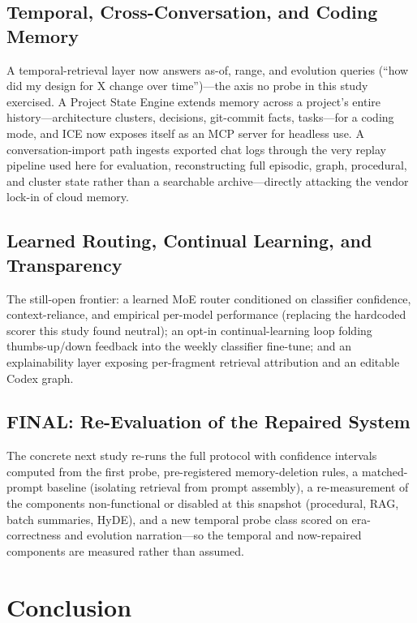 \documentclass[10pt]{article}
\begin{document}
\subsection{Temporal, Cross-Conversation, and Coding Memory}
A temporal-retrieval layer now answers as-of, range, and evolution queries (``how did my design for X change over time'')---the axis no probe in this study exercised. A Project State Engine extends memory across a project's entire history---architecture clusters, decisions, git-commit facts, tasks---for a coding mode, and ICE now exposes itself as an MCP server for headless use. A conversation-import path ingests exported chat logs through the very replay pipeline used here for evaluation, reconstructing full episodic, graph, procedural, and cluster state rather than a searchable archive---directly attacking the vendor lock-in of cloud memory.

\subsection{Learned Routing, Continual Learning, and Transparency}
The still-open frontier: a learned MoE router conditioned on classifier confidence, context-reliance, and empirical per-model performance (replacing the hardcoded scorer this study found neutral); an opt-in continual-learning loop folding thumbs-up/down feedback into the weekly classifier fine-tune; and an explainability layer exposing per-fragment retrieval attribution and an editable Codex graph.

\subsection{FINAL: Re-Evaluation of the Repaired System}
The concrete next study re-runs the full protocol with confidence intervals computed from the first probe, pre-registered memory-deletion rules, a matched-prompt baseline (isolating retrieval from prompt assembly), a re-measurement of the components non-functional or disabled at this snapshot (procedural, RAG, batch summaries, HyDE), and a new temporal probe class scored on era-correctness and evolution narration---so the temporal and now-repaired components are measured rather than assumed.

\section{Conclusion}
\label{sec:conclusion}
\end{document}
